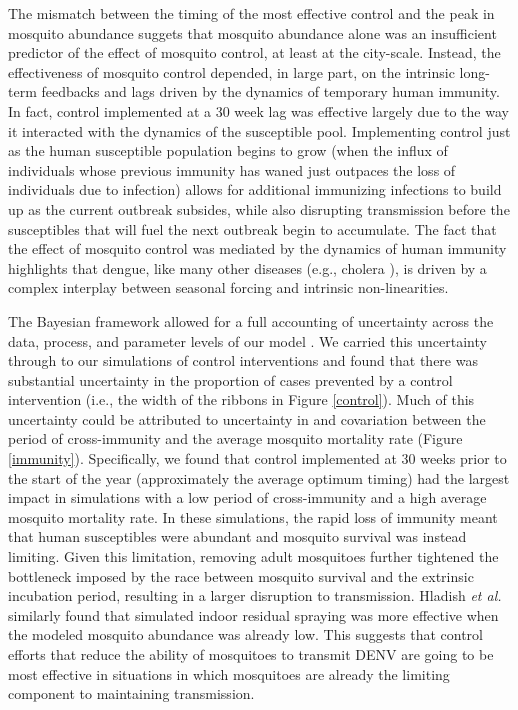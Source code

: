 \documentclass[10pt,letterpaper]{article}
\begin{document}
The mismatch between the timing of the most effective control and the peak in mosquito abundance suggets that mosquito abundance alone was an insufficient predictor of the effect of mosquito control, at least at the city-scale.
Instead, the effectiveness of mosquito control depended, in large part, on the intrinsic long-term feedbacks and lags driven by the dynamics of temporary human immunity.
In fact, control implemented at a 30 week lag was effective largely due to the way it interacted with the dynamics of the susceptible pool. 
Implementing control just as the human susceptible population begins to grow (when the influx of individuals whose previous immunity has waned just outpaces the loss of individuals due to infection) allows for additional immunizing infections to build up as the current outbreak subsides, while also disrupting transmission before the susceptibles that will fuel the next outbreak begin to accumulate.
The fact that the effect of mosquito control was mediated by the dynamics of human immunity highlights that dengue, like many other diseases (e.g., cholera \cite{Koelle2004, Koelle2005}), is driven by a complex interplay between seasonal forcing and intrinsic non-linearities.

The Bayesian framework allowed for a full accounting of uncertainty across the data, process, and parameter levels of our model \cite{Berliner1996}.
We carried this uncertainty through to our simulations of control interventions \cite{Elderd2006} and found that there was substantial uncertainty in the proportion of cases prevented by a control intervention (i.e., the width of the ribbons in Figure \ref{control}).
Much of this uncertainty could be attributed to uncertainty in and covariation between the period of cross-immunity and the average mosquito mortality rate (Figure \ref{immunity}).
Specifically, we found that control implemented at 30 weeks prior to the start of the year (approximately the average optimum timing) had the largest impact in simulations with a low period of cross-immunity and a high average mosquito mortality rate.
In these simulations, the rapid loss of immunity meant that human susceptibles were abundant and mosquito survival was instead limiting.
Given this limitation, removing adult mosquitoes further tightened the bottleneck imposed by the race between mosquito survival and the extrinsic incubation period, resulting in a larger disruption to transmission.
Hladish \emph{et al.} \cite{Hladish2018} similarly found that simulated indoor residual spraying was more effective when the modeled mosquito abundance was already low.
This suggests that control efforts that reduce the ability of mosquitoes to transmit DENV are going to be most effective in situations in which mosquitoes are already the limiting component to maintaining transmission.
\end{document}
